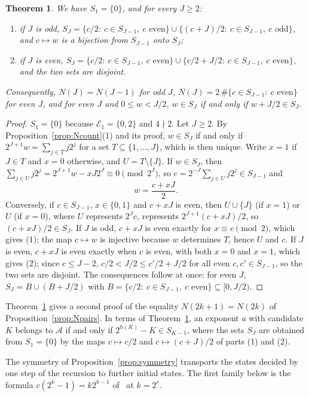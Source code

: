 \documentclass[11pt]{amsart}
\newtheorem{Theorem}{Theorem}[section]
\theoremstyle{definition}
\begin{document}
\begin{Theorem}
\label{thm:bottomup}
We have $S_1=\{0\}$, and for every $J\ge2$:
\begin{enumerate}
\item if $J$ is odd, $S_J=\{c/2:\ c\in S_{J-1},\ c\text{ even}\}\cup\{(c+J)/2:\ c\in S_{J-1},\ c\text{ odd}\}$, and $c\mapsto w$ is a bijection from $S_{J-1}$ onto $S_J$;
\item if $J$ is even, $S_J=\{c/2:\ c\in S_{J-1},\ c\text{ even}\}\cup\{c/2+J/2:\ c\in S_{J-1},\ c\text{ even}\}$, and the two sets are disjoint.
\end{enumerate}
Consequently, $N(J)=N(J-1)$ for odd $J$, $N(J)=2\,\#\{c\in S_{J-1}:\ c\text{ even}\}$ for even $J$, and for even $J$ and $0\le w<J/2$, $w\in S_J$ if and only if $w+J/2\in S_J$.
\end{Theorem}
\begin{proof}
$S_1=\{0\}$ because $\mathcal{E}_1=\{0,2\}$ and $4\nmid2$. Let $J\ge2$. By Proposition~\ref{prop:Ncount}(1) and its proof, $w\in S_J$ if and only if $2^{J+1}w=\sum_{j\in T}j2^j$ for a set $T\subseteq\{1,\dots,J\}$, which is then unique. Write $x=1$ if $J\in T$ and $x=0$ otherwise, and $U=T\setminus\{J\}$. If $w\in S_J$, then $\sum_{j\in U}j2^j=2^{J+1}w-xJ2^J\equiv0\pmod{2^J}$, so $c=2^{-J}\sum_{j\in U}j2^j\in S_{J-1}$ and
\[
w=\frac{c+xJ}{2}.
\]
Conversely, if $c\in S_{J-1}$, $x\in\{0,1\}$ and $c+xJ$ is even, then $U\cup\{J\}$ (if $x=1$) or $U$ (if $x=0$), where $U$ represents $2^Jc$, represents $2^{J+1}(c+xJ)/2$, so $(c+xJ)/2\in S_J$. If $J$ is odd, $c+xJ$ is even exactly for $x\equiv c\pmod2$, which gives (1); the map $c\mapsto w$ is injective because $w$ determines $T$, hence $U$ and $c$. If $J$ is even, $c+xJ$ is even exactly when $c$ is even, with both $x=0$ and $x=1$, which gives (2); since $c\le J-2$, $c/2<J/2\le c'/2+J/2$ for all even $c,c'\in S_{J-1}$, so the two sets are disjoint. The consequences follow at once: for even $J$, $S_J=B\cup(B+J/2)$ with $B=\{c/2:\ c\in S_{J-1},\ c\text{ even}\}\subseteq[0,J/2)$.
\end{proof}

Theorem~\ref{thm:bottomup} gives a second proof of the equality $N(2k+1)=N(2k)$ of Proposition~\ref{prop:Npairs}. In terms of Theorem~\ref{thm:bottomup}, an exponent $a$ with candidate $K$ belongs to $\mathcal{A}$ if and only if $2^{h(K)}-K\in S_{K-1}$, where the sets $S_J$ are obtained from $S_1=\{0\}$ by the maps $c\mapsto c/2$ and $c\mapsto(c+J)/2$ of parts (1) and (2).

The symmetry of Proposition~\ref{prop:symmetry} transports the states decided by one step of the recursion to further initial states. The first family below is the formula $c(2^k-1)=k2^{k-1}$ of~\cite{nicolas2005open} at $k=2^r$.
\end{document}
